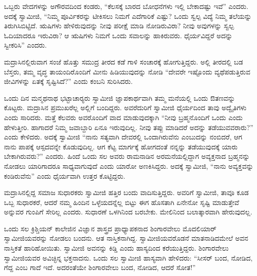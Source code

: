  ಒಬ್ಬರು ವೇದಗಳನ್ನು ಅಗೌರವದಿಂದ ಕಂಡರು, “ಕೆಲಸಕ್ಕೆ ಬಾರದ ಬೋಧನೆಗಳು ಇಲ್ಲಿ ಬೇಕಾದಷ್ಟು ಇವೆ” ಎಂದರು. ಅದಕ್ಕೆ ಸ್ವಾಮೀಜಿ, “ನಿಮ್ಮ ಪೂರ್ವಿಕರನ್ನು ಟೀಕಿಸಲು ನಿಮಗೆ ಎದೆಗಾರಿಕೆ ಎಷ್ಟು? ಒಂದು ಸ್ವಲ್ಪ ವಿದ್ಯೆ ನಿಮ್ಮ ತಲೆಯನ್ನು ತಿರುಗಿಸಿಬಿಟ್ಟಿದೆ. ಋಷಿಗಳು ಹೇಳಿರುವುದನ್ನು ನೀವು ಪರೀಕ್ಷೆ ಮಾಡಿ ನೋಡಿರುವಿರಾ? ನೀವು ಅವುಗಳನ್ನು ಸ್ವಲ್ಪ ಓದಿಯಾದರೂ ಇರುವಿರಾ? ಆ ಋಷಿಗಳು ನಿಮಗೆ ಒಂದು ಸವಾಲನ್ನು ಹಾಕಿರುವರು. ಧೈರ್ಯವಿದ್ದರೆ ಅದನ್ನು ಸ್ವೀಕರಿಸಿ” ಎಂದರು. 

 ಮದ್ರಾಸಿನಲ್ಲಿರುವಾಗ ಸಂಜೆ ಹೊತ್ತು ಸಮುದ್ರ ತೀರದ ಕಡೆ ಗಾಳಿ ಸಂಚಾರಕ್ಕೆ ಹೋಗುತ್ತಿದ್ದರು. ಅಲ್ಲಿ ತೀರದಲ್ಲಿ ಬಡ ಬೆಸ್ತರು, ತಮ್ಮ ವೃದ್ಧ ತಾಯಂದಿರೊಂದಿಗೆ ಮೀನು ಹಿಡಿಯುವುದನ್ನು ನೋಡಿ “ದೇವರೇ ಇಷ್ಟೊಂದು ವ್ಯಥೆಪಡುತ್ತಿರುವ ಜೀವಿಗಳನ್ನು ಏತಕ್ಕೆ ಸೃಷ್ಟಿಸಿದೆ?” ಎಂದು ಕಂಬನಿ ಸುರಿಸಿದರು. 

 ಒಂದು ದಿನ ಮನ್ಮಥನಾಥ ಭಟ್ಟಾಚಾರ‍್ಯರು ಸ್ವಾಮೀಜಿ ಜ್ಞಾಪಕಾರ್ಥವಾಗಿ ತಮ್ಮ ಮನೆಯಲ್ಲಿ ಒಂದು ಔತಣವನ್ನು ಕೊಟ್ಟರು. ಮದ್ರಾಸಿನ ಪ್ರಮುಖರೆಲ್ಲ ಅಲ್ಲಿಗೆ ಬಂದಿದ್ದರು. ಅವರೆದುರಿಗೆ ಸ್ವಾಮೀಜಿ ಧೈರ್ಯದಿಂದ ತಾವು ಅದ್ವೈತಿಗಳು ಎಂದು ಸಾರಿದರು. ಮತ್ತೆ ಕೆಲವರು ಅವರೊಂದಿಗೆ ವಾದ ಮಾಡುವುದಕ್ಕಾಗಿ “ನೀವು ಬ್ರಹ್ಮನೊಂದಿಗೆ ಒಂದು ಎಂದು ಹೇಳುತ್ತೀರಿ. ಹಾಗಾದರೆ ನಿಮ್ಮ ಜವಾಬ್ದಾರಿ ಏನೂ ಇರುವುದಿಲ್ಲ. ನೀವು ತಪ್ಪು ಮಾಡಿದರೆ ಅದನ್ನು ತಡೆಯುವವರಾರು?” ಎಂದು ಕೇಳಿದರು. ಅದಕ್ಕೆ ಸ್ವಾಮೀಜಿ “ನಾನು ಸತ್ಯವಾಗಿ ದೇವರಲ್ಲಿ ಒಂದಾಗಿರುವೆನು ಎಂಬುದನ್ನು ನಂಬಿದರೆ, ಆಗ ನಾನು ಪಾಪಕ್ಕೆ ಆಸ್ಪದವನ್ನೇ ಕೊಡುವುದಿಲ್ಲ. ಆಗ ಕೆಟ್ಟ ಮಾರ್ಗಕ್ಕೆ ಹೋಗದಂತೆ ನನ್ನನ್ನು ತಡೆಯುವುದಕ್ಕೆ ಯಾರು ಬೇಕಾಗಿರುವರು?” ಎಂದರು. ಹಿಂದೆ ಒಂದು ಸಲ ಅವರು ರಾಮನಾಡಿನ ಅರಮನೆಯಲ್ಲಿದ್ದಾಗ ಅವ್ಯಕ್ತನಾದ ಬ್ರಹ್ಮನನ್ನು ನೋಡಲು ಯಾರಿಗಾದರೂ ಸಾಧ್ಯವಾಗುವುದೆ ಎಂದು ಯಾರೋ ಅಣಕಿಸಿದ್ದರು. ಅದಕ್ಕೆ ಸ್ವಾಮೀಜಿ, “ನಾನು ಅವ್ಯಕ್ತವನ್ನು ಕಂಡಿರುವೆನು” ಎಂದು ಧೈರ್ಯವಾಗಿ ಉತ್ತರ ಕೊಟ್ಟಿದ್ದರು. 

 ಮದ್ರಾಸಿನಲ್ಲಿದ್ದ ಸಮಾಜ ಸುಧಾರಕರು ಸ್ವಾಮೀಜಿ ಹತ್ತಿರ ಬಂದು ವಾದಿಸುತ್ತಿದ್ದರು. ಅವರಿಗೆ ಸ್ವಾಮೀಜಿ, ತಾವೂ ಕೂಡ ಒಬ್ಬ ಸುಧಾರಕರೆ, ಆದರೆ ನಮ್ಮ ಹಿಂದಿನ ಒಳ್ಳೆಯದನ್ನೆಲ್ಲ ಬಿಟ್ಟು ಈಗ ಹೊಸತಾಗಿ ಏನೇನೋ ಸೃಷ್ಟಿ ಮಾಡುತ್ತೇವೆ ಅನ್ನುವರ ಗುಂಪಿಗೆ ಸೇರಿಲ್ಲ ಎಂದರು. ಸುಧಾರಣೆ ಒಳಗಿನಿಂದ ಬರಬೇಕು. ಮೇಲಿನಿಂದ ಬಲಾತ್ಕಾರವಾಗಿ ಹೇರುವುದಲ್ಲ. 

 ಒಂದು ಸಲ ಕ್ರಿಶ್ಚಿಯನ್ ಕಾಲೇಜಿನ ವಿಜ್ಞಾನ ಶಾಸ್ತ್ರದ ಪ್ರಾಧ್ಯಾಪಕನಾದ ಶಿಂಗಾರವೇಲು ಮೊದಲಿಯಾರ್ ಸ್ವಾಮೀಜಿಯವರನ್ನು ನೋಡಲು ಬಂದನು. ಆತ ನಾಸ್ತಿಕನಾಗಿದ್ದ. ಸ್ವಾಮೀಜಿಯವರೊಡನೆ ಮಾತನಾಡಿದಮೇಲೆ ಅವನ ನಾಸ್ತಿಕತೆ ಹಾರಿಹೋಯಿತು. ಸ್ವಾಮೀಜಿ ಅವನನ್ನು ಕಿಡ್ಡಿ ಎಂದು ಹಾಸ್ಯದಿಂದ ಕರೆಯುತ್ತಿದ್ದರು. ಶಿಂಗಾರವೇಲು ಸ್ವಾಮೀಜಿಯವರ ಅವಿಚ್ಛಿನ್ನ ಭಕ್ತನಾದನು. ಒಂದು ಸಲ ಸ್ವಾಮೀಜಿ ಹಾಸ್ಯವಾಗಿ ಹೇಳಿದರು: “ಸೀಸರ್ ಬಂದ, ನೋಡಿದ, ಗೆದ್ದ ಎಂಬ ಗಾದೆ ಇದೆ. ಅದರಂತೆಯೇ ಶಿಂಗಾರವೇಲು ಬಂದ, ನೋಡಿದ, ಆದರೆ ಸೋತ!” 

